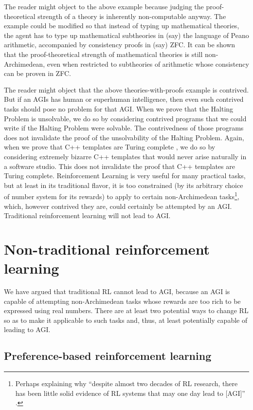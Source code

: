 \documentclass[reqno]{article}
\theoremstyle{definition}
\begin{document}
The reader might object to the above example because judging the proof-theoretical
strength of a theory is inherently non-computable anyway. The example could be
modified so that instead of typing up mathematical theories, the agent has to
type up mathematical subtheories in (say) the language of Peano arithmetic,
accompanied by consistency proofs in (say) ZFC. It can be shown that the
proof-theoretical strength of mathematical theories is still non-Archimedean,
even when restricted to subtheories of arithmetic whose consistency can be
proven in ZFC.

The reader might object that the above theories-with-proofs example is contrived.
But if an AGIs has human or superhuman intelligence, then even such contrived
tasks should pose no problem for that AGI. When we prove that the Halting Problem
is unsolvable, we do so by considering contrived programs that we could write if
the Halting Problem were solvable. The contrivedness of those programs does not
invalidate the proof of the unsolvability of the Halting Problem. Again, when we
prove that C++ templates are Turing complete \cite{veldhuizen}, we do so by
considering extremely
bizarre C++ templates that would never arise naturally in a software
studio. This does not invalidate the proof that C++ templates are Turing complete.
Reinforcement Learning is very useful for many practical tasks, but at least in
its traditional flavor, it is too constrained (by its arbitrary choice of number
system for its rewards) to apply to certain
non-Archimedean tasks\footnote{Perhaps explaining why
``despite almost two decades of RL research, there has been little solid
evidence of RL systems that may one day lead to [AGI]''
\cite{livingston}.}, which, however contrived they are, could certainly be
attempted by an AGI. Traditional reinforcement learning will not lead to AGI.

\section{Non-traditional reinforcement learning}
\label{nontraditionalsection}

We have argued that traditional RL cannot lead to AGI, because
an AGI is capable of attempting non-Archimedean tasks whose rewards are
too rich to be expressed using real numbers. There are at least two
potential ways to change RL so as to make it applicable to such tasks and,
thus, at least potentially capable of leading to AGI.

\subsection{Preference-based reinforcement learning}
\end{document}
